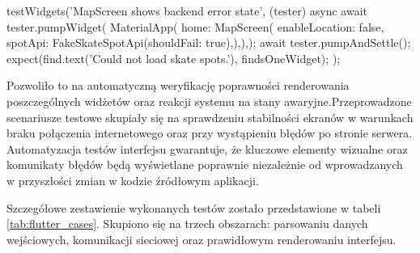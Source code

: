         \begin{code}[
            language=Dart,
            caption={Fragment testu widżetów weryfikującego renderowanie błędu na ekranie mapy.},
            label={lst:flutter_tests}
        ]
testWidgets('MapScreen shows backend error state', (tester) async {
  await tester.pumpWidget(
    MaterialApp(
      home: MapScreen(
        enableLocation: false,
        spotApi: FakeSkateSpotApi(shouldFail: true),),),);
  await tester.pumpAndSettle();
  expect(find.text('Could not load skate spots.'), findsOneWidget);
});        \end{code} 
Pozwoliło to na automatyczną weryfikację poprawności renderowania poszczególnych widżetów oraz reakcji systemu na stany awaryjne.Przeprowadzone scenariusze testowe skupiały się na sprawdzeniu stabilności ekranów w warunkach braku połączenia internetowego oraz przy wystąpieniu błędów po stronie serwera. Automatyzacja testów interfejsu gwarantuje, że kluczowe elementy wizualne oraz komunikaty błędów będą wyświetlane poprawnie niezależnie od wprowadzanych w przyszłości zmian w kodzie źródłowym aplikacji.

Szczegółowe zestawienie wykonanych testów zostało przedstawione w tabeli \ref{tab:flutter_cases}. Skupiono się na trzech obszarach: parsowaniu danych wejściowych, komunikacji sieciowej oraz prawidłowym renderowaniu interfejsu.

